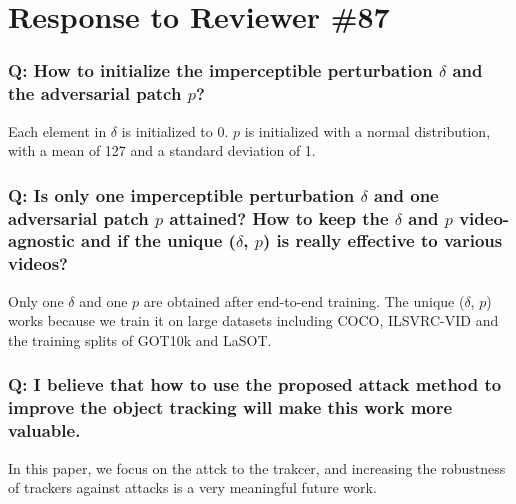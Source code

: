 \documentclass{article}
\begin{document}
\section{Response to Reviewer \#87}

\subsubsection{Q: How to initialize the imperceptible perturbation $\delta$ and the adversarial patch $p$?}
Each element in $\delta$ is initialized to 0.
$p$ is initialized with a normal distribution, with a mean of 127 and a standard deviation of 1.

\subsubsection{Q: Is only one imperceptible perturbation $\delta$ and one adversarial patch $p$ attained? How to keep the $\delta$ and $p$ video-agnostic and if the unique ($\delta$, $p$) is really effective to various videos?}
Only one $\delta$ and one $p$ are obtained after end-to-end training. The unique ($\delta$, $p$) works because we train it on large datasets including COCO, ILSVRC-VID and the training splits of GOT10k and LaSOT.

\subsubsection{Q: I believe that how to use the proposed attack method to improve the object tracking will make this work more valuable.}
In this paper, we focus on the attck to the trakcer, and increasing the robustness of trackers against attacks is a very meaningful future work.



\end{document}
